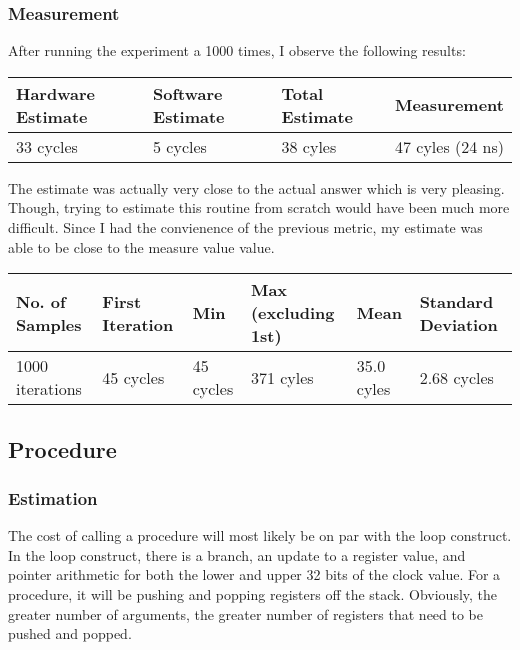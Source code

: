\documentclass[paper=a4, fontsize=11pt]{scrartcl}
\numberwithin{equation}{section}		%
\numberwithin{figure}{section}			%
\numberwithin{table}{section}				%
\begin{document}
\subsubsection{Measurement}

After running the experiment a 1000 times, I observe the following results:

\begin{center}
    \begin{tabular}{ | l | l | l | p{5cm} |}
    \hline
    Hardware Estimate & Software Estimate & Total Estimate & Measurement \\ \hline
    33 cycles & 5 cycles & 38 cyles & 47 cyles (24 ns) \\ 
    \hline
    \end{tabular}
\end{center}

The estimate was actually very close to the actual answer which is very pleasing.  Though, trying to estimate this routine from scratch would have been much more difficult.  Since I had the convienence of the previous metric, my estimate was able to be close to the measure value value.

\begin{center}
    \begin{tabular}{ | l | l | l | l | l | l |}
    \hline
    No. of Samples & First Iteration & Min & Max (excluding 1st) & Mean & Standard Deviation \\ \hline
    1000 iterations & 45 cycles & 45 cycles & 371 cyles & 35.0 cyles & 2.68 cycles \\ 
    \hline
    \end{tabular}
\end{center}

\subsection{Procedure}

\subsubsection{Estimation}

The cost of calling a procedure will most likely be on par with the loop construct.  In the loop construct, there is a branch, an update to a register value, and pointer arithmetic for both the lower and upper 32 bits of the clock value.  For a procedure, it will be pushing and popping registers off the stack.  Obviously, the greater number of arguments, the greater number of registers that need to be pushed and popped.
\end{document}
